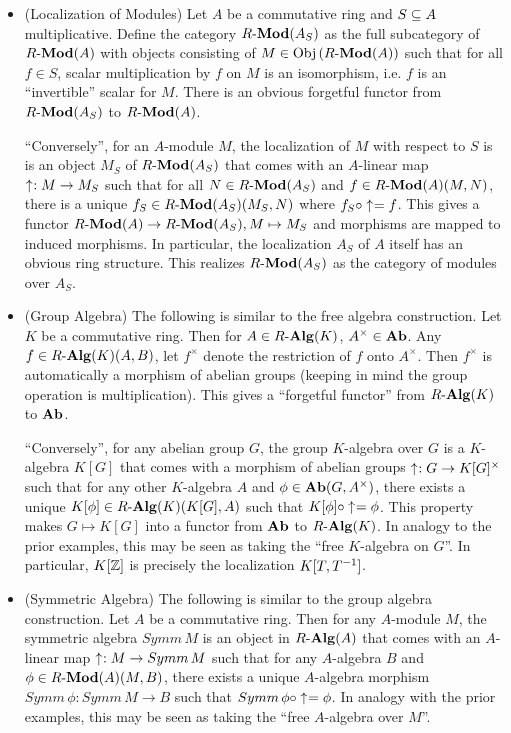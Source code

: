 \begin{eg}
\begin{itemize}
    \item (Localization of Modules)
    Let $A$ be a commutative ring and $S \subseteq A$ multiplicative. 
    Define the category $R\text{-}\mathbf{Mod}(A_S)$ as the full subcategory of $R\text{-}\mathbf{Mod}(A)$ 
    with objects consisting of $M \in \mathrm{Obj}\left(R\text{-}\mathbf{Mod}(A)\right)$ such that 
    for all $f \in S$, scalar multiplication by $f$ on $M$ is an isomorphism,
    i.e. $f$ is an ``invertible'' scalar for $M$.
    There is an obvious forgetful functor from $R\text{-}\mathbf{Mod}(A_S)$ to $R\text{-}\mathbf{Mod}(A)$.

    ``Conversely'', for an $A$-module $M$, 
    the localization of $M$ with respect to $S$ is 
    is an object $M_S$ of $R\text{-}\mathbf{Mod}(A_S)$ that comes with 
    an $A$-linear map $\uparrow_{}^{} : M \to M_S$ such that 
    for all $N \in R\text{-}\mathbf{Mod}(A_S)$ and $f \in R\text{-}\mathbf{Mod}(A)(M,N)$,
    there is a unique $f_S \in R\text{-}\mathbf{Mod}(A_S)(M_S,N)$ where 
    $f_S \circ \uparrow_{}^{} = f$.
    This gives a functor $R\text{-}\mathbf{Mod}(A) \to R\text{-}\mathbf{Mod}(A_S), M \mapsto M_S$
    and morphisms are mapped to induced morphisms. 
    In particular, the localization $A_S$ of $A$ itself 
    has an obvious ring structure.
    This realizes $R\text{-}\mathbf{Mod}(A_S)$ as the category of modules over $A_S$.

    \item (Group Algebra)
    The following is similar to the free algebra construction. 
    Let $K$ be a commutative ring.
    Then for $A \in R\text{-}\mathbf{Alg}(K)$, $A^\times \in \mathbf{Ab}$.
    Any $f \in R\text{-}\mathbf{Alg}(K)(A,B)$, 
    let $f^\times$ denote the restriction of $f$ onto $A^\times$.
    Then $f^\times$ is automatically a morphism of abelian groups
    (keeping in mind the group operation is multiplication).
    This gives a ``forgetful functor'' from $R\text{-}\mathbf{Alg}(K)$ to $\mathbf{Ab}$.
    
    ``Conversely'',
    for any abelian group $G$,
    the group $K$-algebra over $G$ is a $K$-algebra $K[G]$ that comes with
    a morphism of abelian groups $\uparrow_{}^{} : G \to K[G]^\times$ such that
    for any other $K$-algebra $A$ and $\phi \in \mathbf{Ab}(G,A^\times)$,
    there exists a unique $K[\phi] \in R\text{-}\mathbf{Alg}(K)(K[G],A)$ such that 
    $K[\phi] \circ \uparrow_{}^{} = \phi$. 
    This property makes $G \mapsto K[G]$ into a functor from 
    $\mathbf{Ab}$ to $R\text{-}\mathbf{Alg}(K)$.
    In analogy to the prior examples,
    this may be seen as taking the ``free $K$-algebra on $G$''.
    In particular, $K[\mathbb{Z}]$ is precisely the localization $K[T,T^{-1}]$. 

    \item (Symmetric Algebra)
    The following is similar to the group algebra construction.
    Let $A$ be a commutative ring.
    Then for any $A$-module $M$,
    the symmetric algebra $Symm\,M$ is an object in $R\text{-}\mathbf{Alg}(A)$ 
    that comes with an $A$-linear map $\uparrow_{}^{} : M \to Symm\,M$
    such that for any $A$-algebra $B$ and $\phi \in R\text{-}\mathbf{Mod}(A)(M,B)$,
    there exists a unique $A$-algebra morphism $Symm\,\phi : Symm\,M \to B$
    such that $Symm\,\phi \circ \uparrow_{}^{} = \phi$.
    In analogy with the prior examples,
    this may be seen as taking the ``free $A$-algebra over $M$''.


\end{itemize}
\end{eg}

